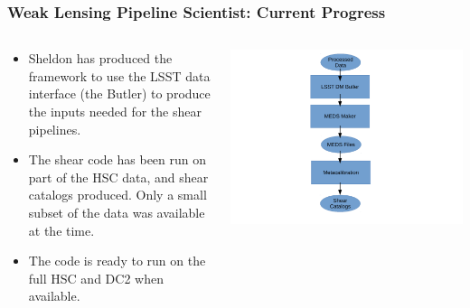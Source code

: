 \documentclass[aspectratio=169]{beamer}
\begin{document}
\frame
{

    \frametitle{Weak Lensing Pipeline Scientist: Current Progress}


    \begin{columns}
        \begin{column}{0.5\textwidth}
            \begin{itemize}

                \item Sheldon has produced the framework to
                    use the LSST data interface (the Butler) to
                    produce the inputs needed for the shear
                    pipelines.

                \item The shear code has been run on part of the HSC data, and shear
                    catalogs produced.  Only a small subset of the data was available
                    at the time.

                \item The code is ready to run on the full HSC and DC2 when available.

            \end{itemize}
        \end{column}
        \begin{column}{0.5\textwidth}
            \centering
            \includegraphics[width=\textwidth]{LSSTWorkflow.pdf}
        \end{column}
    \end{columns}
}
\end{document}
